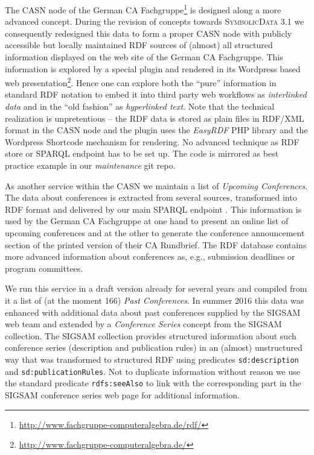 \documentclass[a4paper,11pt]{article}
\def\SD{\textsc{Symbolic\-Data}}
\begin{document}
\begin{multicols}{2}
The CASN node of the German CA Fachgruppe\footnote{
  \url{http://www.fachgruppe-computeralgebra.de/rdf/}} is designed along a
more advanced concept. During the revision of concepts towards {\SD} 3.1 we
consequently redesigned this data to form a proper CASN node with publicly
accessible but locally maintained RDF sources of (almost) all structured
information displayed on the web site of the German CA Fachgruppe.  This
information is explored by a special plugin and rendered in its Wordpress
based web presentation\footnote{
  \url{http://www.fachgruppe-computeralgebra.de/}}.  Hence one can explore
both the ``pure'' information in standard RDF notation to embed it into third
party web workflows as \emph{interlinked data} and in the ``old fashion'' as
\emph{hyperlinked text}.  Note that the technical realization is unpretentious
-- the RDF data is stored as plain files in RDF/XML format in the CASN node
and the plugin uses the \emph{EasyRDF} PHP library and the Wordpress Shortcode
mechanism for rendering.  No advanced technique as RDF store or SPARQL
endpoint has to be set up.  The code is mirrored as best practice example in
our \emph{maintenance} git repo.


As another service within the CASN we maintain a list of \emph{Upcoming
  Conferences}.  The data about conferences is extracted from several sources,
transformed into RDF format and delivered by our main SPARQL endpoint
\cite{sdsparql}.  This information is used by the German CA Fachgruppe at one
hand to present an online list of upcoming conferences and at the other to
generate the conference announcement section of the printed version of their
CA Rundbrief.  The RDF database contains more advanced information about
conferences as, e.g., submission deadlines or program committees.

We run this service in a draft version already for several years and compiled
from it a list of (at the moment 166) \emph{Past Conferences}. In summer 2016
this data was enhanced with additional data about past conferences supplied by
the SIGSAM web team and extended by a \emph{Conference Series} concept from
the SIGSAM collection.  The SIGSAM collection provides structured information
about such conference series (description and publication rules) in an
(almost) unstructured way that was transformed to structured RDF using
predicates \texttt{sd:description} and \texttt{sd:publicationRules}.  Not to
duplicate information without reason we use the standard predicate
\texttt{rdfs:seeAlso} to link with the corresponding part in the SIGSAM
conference series web page for additional information.


\end{multicols}
\end{document}

